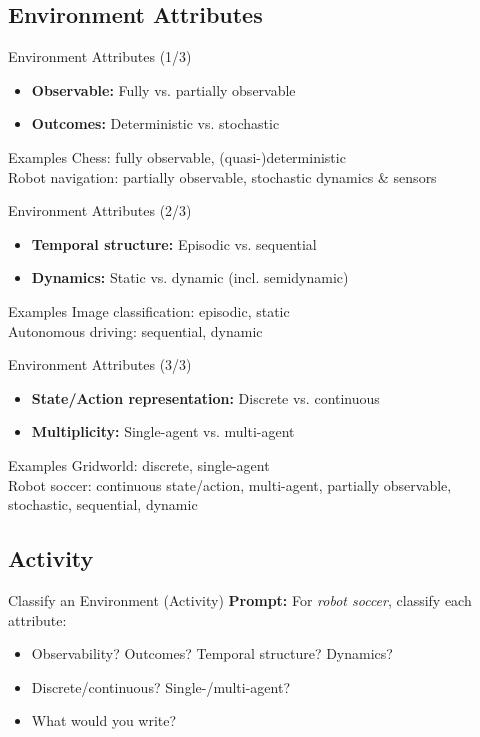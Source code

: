 \documentclass[aspectratio=169]{beamer}
\begin{document}
\subsection{Environment Attributes}
\begin{frame}{Environment Attributes (1/3)}
\begin{itemize}
  \item \textbf{Observable:} Fully vs. partially observable
  \item \textbf{Outcomes:} Deterministic vs. stochastic
\end{itemize}
\begin{block}{Examples}
Chess: fully observable, (quasi-)deterministic\\
Robot navigation: partially observable, stochastic dynamics \& sensors
\end{block}
\end{frame}

\begin{frame}{Environment Attributes (2/3)}
\begin{itemize}
  \item \textbf{Temporal structure:} Episodic vs. sequential
  \item \textbf{Dynamics:} Static vs. dynamic (incl. semidynamic)
\end{itemize}
\begin{block}{Examples}
Image classification: episodic, static\\
Autonomous driving: sequential, dynamic
\end{block}
\end{frame}

\begin{frame}{Environment Attributes (3/3)}
\begin{itemize}
  \item \textbf{State/Action representation:} Discrete vs. continuous
  \item \textbf{Multiplicity:} Single-agent vs. multi-agent
\end{itemize}
\begin{block}{Examples}
Gridworld: discrete, single-agent\\
Robot soccer: continuous state/action, multi-agent, partially observable, stochastic, sequential, dynamic
\end{block}
\end{frame}

\subsection{Activity}
\begin{frame}{Classify an Environment (Activity)}
\textbf{Prompt:} For \emph{robot soccer}, classify each attribute:
\begin{itemize}
  \item Observability? Outcomes? Temporal structure? Dynamics?
  \item Discrete/continuous? Single-/multi-agent?
  \item What \PEAS{} would you write?
\end{itemize}
\end{frame}
\end{document}

